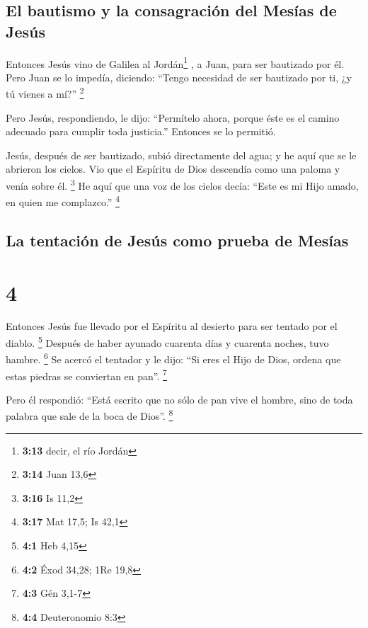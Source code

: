 \hypertarget{el-bautismo-y-la-consagraciuxf3n-del-mesuxedas-de-jesuxfas}{%
\subsection{El bautismo y la consagración del Mesías de
Jesús}\label{el-bautismo-y-la-consagraciuxf3n-del-mesuxedas-de-jesuxfas}}

 Entonces Jesús vino de Galilea al Jordán\footnote{\textbf{3:13}
  decir, el río Jordán} , a Juan, para ser bautizado por él.
 Pero Juan se lo impedía, diciendo: ``Tengo necesidad de
ser bautizado por ti, ¿y tú vienes a mí?'' \footnote{\textbf{3:14} Juan
  13,6}

 Pero Jesús, respondiendo, le dijo: ``Permítelo ahora,
porque éste es el camino adecuado para cumplir toda justicia.'' Entonces
se lo permitió.

 Jesús, después de ser bautizado, subió directamente del
agua; y he aquí que se le abrieron los cielos. Vio que el Espíritu de
Dios descendía como una paloma y venía sobre él. \footnote{\textbf{3:16}
  Is 11,2}  He aquí que una voz de los cielos decía:
``Este es mi Hijo amado, en quien me complazco.'' \footnote{\textbf{3:17}
  Mat 17,5; Is 42,1}

\hypertarget{la-tentaciuxf3n-de-jesuxfas-como-prueba-de-mesuxedas}{%
\subsection{La tentación de Jesús como prueba de
Mesías}\label{la-tentaciuxf3n-de-jesuxfas-como-prueba-de-mesuxedas}}

\hypertarget{section-3}{%
\section{4}\label{section-3}}

 Entonces Jesús fue llevado por el Espíritu al desierto
para ser tentado por el diablo. \footnote{\textbf{4:1} Heb 4,15}
 Después de haber ayunado cuarenta días y cuarenta noches,
tuvo hambre. \footnote{\textbf{4:2} Éxod 34,28; 1Re 19,8} 
Se acercó el tentador y le dijo: ``Si eres el Hijo de Dios, ordena que
estas piedras se conviertan en pan''. \footnote{\textbf{4:3} Gén 3,1-7}

 Pero él respondió: ``Está escrito que no sólo de pan vive
el hombre, sino de toda palabra que sale de la boca de Dios''.
\footnote{\textbf{4:4} Deuteronomio 8:3}

